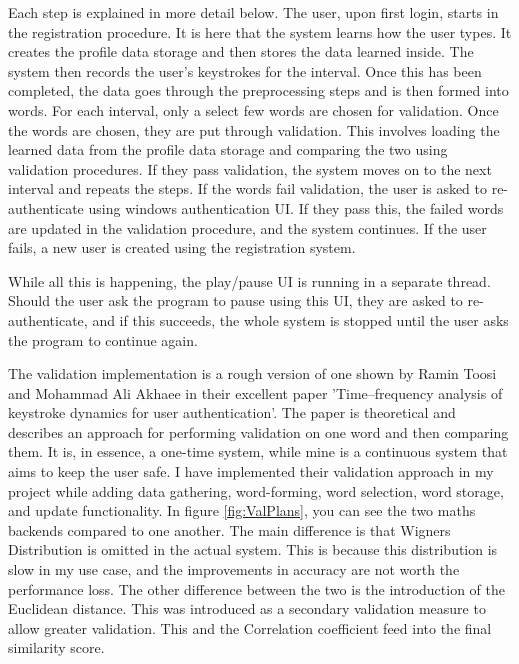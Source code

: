 \documentclass[10pt,a4paper]{report}
\begin{document}
Each step is explained in more detail below. The user, upon first login, starts in the registration procedure. It is here that the system learns how the user types. It creates the profile data storage and then stores the data learned inside. The system then records the user's keystrokes for the interval. Once this has been completed, the data goes through the preprocessing steps and is then formed into words. For each interval, only a select few words are chosen for validation. Once the words are chosen, they are put through validation. This involves loading the learned data from the profile data storage and comparing the two using validation procedures. If they pass validation, the system moves on to the next interval and repeats the steps. If the words fail validation, the user is asked to re-authenticate using windows authentication UI. If they pass this, the failed words are updated in the validation procedure, and the system continues. If the user fails, a new user is created using the registration system. 

While all this is happening, the play/pause UI is running in a separate thread. Should the user ask the program to pause using this UI, they are asked to re-authenticate, and if this succeeds, the whole system is stopped until the user asks the program to continue again. 

The validation implementation is a rough version of one shown by Ramin Toosi and Mohammad Ali Akhaee in their excellent paper 'Time–frequency analysis of keystroke dynamics for user authentication'. \cite{ToosiRamin2021Taok} The paper is theoretical and describes an approach for performing validation on one word and then comparing them. It is, in essence, a one-time system, while mine is a continuous system that aims to keep the user safe. I have implemented their validation approach in my project while adding data gathering, word-forming, word selection, word storage, and update functionality. In figure \ref{fig:ValPlans}, you can see the two maths backends compared to one another. The main difference is that Wigners Distribution is omitted in the actual system. This is because this distribution is slow in my use case, and the improvements in accuracy are not worth the performance loss. The other difference between the two is the introduction of the Euclidean distance. This was introduced as a secondary validation measure to allow greater validation. This and the Correlation coefficient feed into the final similarity score.
\end{document}
